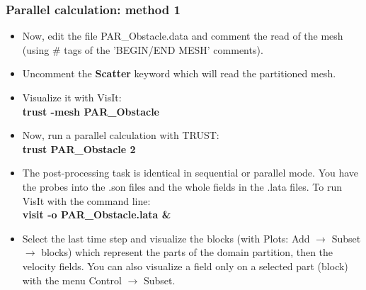 \documentclass[10pt, hyperref={unicode=true,pdfusetitle, bookmarks=true,bookmarksnumbered=false,bookmarksopen=false, breaklinks=false,pdfborder={0 0 1},backref=true,colorlinks=true,linkcolor=darkblue,pageanchor}]{beamer}
\begin{document}
\begin{frame}
\frametitle{Parallel calculation: method 1}
\begin{block}{}

\begin{itemize}
\item Now, edit the file PAR\_Obstacle.data and comment the read of the mesh
(using \# tags of the 'BEGIN/END MESH' comments).

\item Uncomment the \textbf{Scatter} keyword which will read the partitioned mesh. 

\item Visualize it with VisIt:\\
\textbf{trust -mesh PAR\_Obstacle}

\item Now, run a parallel calculation with TRUST:\\
\textbf{trust PAR\_Obstacle 2}

\item The post-processing task is identical in sequential or parallel mode. You have the
probes into the .son files and the whole fields in the .lata files. To run VisIt with the
command line:\\
\textbf{visit -o PAR\_Obstacle.lata \&}

\item Select the last time step and visualize the blocks (with Plots: Add $\rightarrow$ Subset $\rightarrow$ blocks)
which represent the parts of the domain partition, then the velocity fields. You can
also visualize a field only on a selected part (block) with the menu Control $\rightarrow$ Subset.
\end{itemize}

\end{block}
\end{frame}
\end{document}
